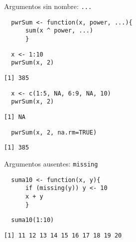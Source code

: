 \documentclass[xcolor={usenames,svgnames,dvipsnames}]{beamer}
\begin{document}
\begin{frame}[fragile,label={sec:orgheadline8}]{Argumentos sin nombre: \texttt{...}}
 \lstset{language=R,label= ,caption= ,captionpos=b,numbers=none}
\begin{lstlisting}
  pwrSum <- function(x, power, ...){
      sum(x ^ power, ...)
      }
\end{lstlisting}

\lstset{language=R,label= ,caption= ,captionpos=b,numbers=none}
\begin{lstlisting}
  x <- 1:10
  pwrSum(x, 2)
\end{lstlisting}

\begin{verbatim}
[1] 385
\end{verbatim}

\lstset{language=R,label= ,caption= ,captionpos=b,numbers=none}
\begin{lstlisting}
  x <- c(1:5, NA, 6:9, NA, 10)
  pwrSum(x, 2)
\end{lstlisting}

\begin{verbatim}
[1] NA
\end{verbatim}

\lstset{language=R,label= ,caption= ,captionpos=b,numbers=none}
\begin{lstlisting}
  pwrSum(x, 2, na.rm=TRUE)
\end{lstlisting}

\begin{verbatim}
[1] 385
\end{verbatim}
\end{frame}

\begin{frame}[fragile,label={sec:orgheadline9}]{Argumentos ausentes: \texttt{missing}}
 \lstset{language=R,label= ,caption= ,captionpos=b,numbers=none}
\begin{lstlisting}
  suma10 <- function(x, y){
      if (missing(y)) y <- 10
      x + y
      }
\end{lstlisting}

\lstset{language=R,label= ,caption= ,captionpos=b,numbers=none}
\begin{lstlisting}
  suma10(1:10)
\end{lstlisting}

\begin{verbatim}
[1] 11 12 13 14 15 16 17 18 19 20
\end{verbatim}
\end{frame}
\end{document}
